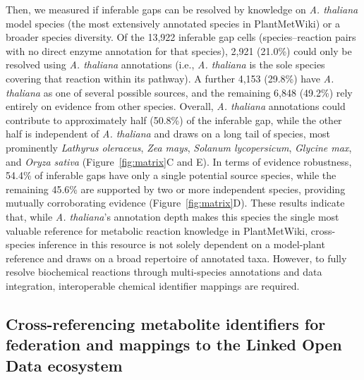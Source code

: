 \documentclass[11pt,a4paper]{article}
\newcommand{\rev}[1]{#1}
\begin{document}
Then, we measured if inferable gaps can be resolved by knowledge on \textit{A. thaliana} model species (the most extensively annotated species in PlantMetWiki) or a broader species diversity. Of the 13,922 inferable gap cells (species--reaction pairs with no direct enzyme
annotation for that species), 2,921 (21.0\%) could only be resolved using \textit{A. thaliana}
annotations (i.e., \textit{A. thaliana} is the sole species covering that reaction within its
pathway). A further 4,153 (29.8\%) have \textit{A. thaliana} as one of several possible sources, and
the remaining 6,848 (49.2\%) rely entirely on evidence from other species. Overall, \textit{A.
thaliana} annotations could contribute to approximately half (50.8\%) of the inferable gap, while the
other half is independent of \textit{A. thaliana} and draws on a long tail of species, most prominently
\textit{Lathyrus oleraceus}, \textit{Zea mays}, \textit{Solanum lycopersicum}, \textit{Glycine max},
and \textit{Oryza sativa} (Figure~\ref{fig:matrix}C and E). In terms of evidence robustness, 54.4\% of
inferable gaps have only a single potential source species, while the remaining 45.6\% are
supported by two or more independent species, providing mutually corroborating evidence (Figure~\ref{fig:matrix}D). These results
indicate that, while \textit{A. thaliana}'s annotation depth makes this species the single most valuable
reference for metabolic reaction knowledge in PlantMetWiki, cross-species inference in this resource is not solely dependent on
a model-plant reference and draws on a broad repertoire of annotated taxa. However, to fully resolve biochemical reactions through multi-species annotations and data integration, interoperable chemical identifier mappings are required.

\subsection*{Cross-referencing metabolite identifiers for federation and mappings to the Linked Open Data ecosystem}

\end{document}
